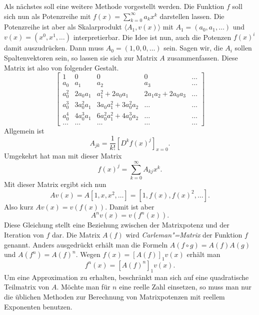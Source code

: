 \documentclass[a4paper,11pt,fleqn,twocolumn,twoside]{scrartcl}
\numberwithin{equation}{section}
\begin{document}
Als nächstes soll eine weitere Methode vorgestellt werden. Die
Funktion $f$ soll sich nun als Potenzreihe mit
$f(x)=\sum_{k=0}^\infty a_kx^k$ darstellen lassen. Die Potenzreihe
ist aber als Skalarprodukt $\langle A_1,v(x)\rangle$ mit
$A_1=(a_0,a_1,\ldots)$ und $v(x)=(x^0,x^1,\ldots)$
interpretierbar. Die Idee ist nun, auch die Potenzen $f(x)^i$ damit
auszudrücken. Dann muss $A_0=(1,0,0,\ldots)$ sein. Sagen wir, die
$A_i$ sollen Spaltenvektoren sein, so lassen sie sich zur Matrix
$A$ zusammenfassen. Diese Matrix ist also von folgender Gestalt.
\[\begin{bmatrix}
1 & 0 & 0 & 0 & \ldots\\
a_0 & a_1 & a_2 & a_3 & \ldots\\
a_0^2 & 2a_0a_1 & a_1^2+2a_0a_1 & 2a_1a_2+2a_0a_3 &\ldots\\
a_0^3 & 3a_0^2a_1 & 3a_0a_1^2+3a_0^2a_2 &\ldots &\ldots\\
a_0^4 & 4a_0^3a_1 & 6a_0^2a_1^2+4a_0^3a_2 & \ldots & \ldots\\
\ldots &\ldots &\ldots &\ldots & \ldots
\end{bmatrix}\]
Allgemein ist
\begin{equation}
A_{jk} = \frac{1}{k!}[D^k f(x)^j]_{x=0}.
\end{equation}
Umgekehrt hat man mit dieser Matrix
\begin{equation}
f(x)^j = \sum_{k=0}^\infty A_{kj} x^k.
\end{equation}
Mit dieser Matrix ergibt sich nun
\begin{equation}
Av(x) = A[1,x,x^2,\ldots] = [1,f(x),f(x)^2,\ldots].
\end{equation}
Also kurz $Av(x)=v(f(x))$. Damit ist aber
\begin{equation}
A^n v(x) = v(f^n(x)).
\end{equation}
Diese Gleichung stellt eine Beziehung zwischen der Matrixpotenz und
der Iteration von $f$ dar. Die Matrix $A(f)$ wird
\textit{Carleman"=Matrix}
der Funktion $f$ genannt. Anders ausgedrückt erhält man die Formeln
$A(f\circ g) = A(f)A(g)$ und $A(f^n)=A(f)^n$.
Wegen $f(x)=[A(f)]_1v(x)$ erhält man
\begin{equation}
f^n(x) = [A(f)^n]_1v(x).
\end{equation}
Um eine Approximation zu erhalten, beschränkt man sich auf eine
quadratische Teilmatrix von $A$. Möchte man für $n$ eine reelle
Zahl einsetzen, so muss man nur die üblichen Methoden zur Berechnung
von Matrixpotenzen mit reellem Exponenten benutzen.
\end{document}
